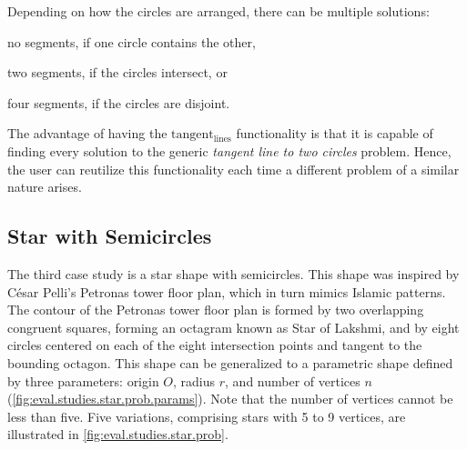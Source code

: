 Depending on how the circles are arranged, there can be multiple solutions:
\begin{enumerate*}[label= (\arabic*)]
  \item no segments, if one circle contains the other,
  \item two segments, if the circles intersect, or
  \item four segments, if the circles are disjoint.
\end{enumerate*}
The advantage of having the $\mathrm{tangent_{lines}}$ functionality is that it
is capable of finding every solution to the generic \textit{tangent line to two
circles} problem.  Hence, the user can reutilize this functionality each time
a different problem of a similar nature arises.

\subsection{Star with Semicircles}%
\label{sec:eval.studies.star}

The third case study is a star shape with semicircles.  This shape was inspired
by César Pelli's Petronas tower floor plan, which in turn mimics Islamic
patterns.  The contour of the Petronas tower floor plan is formed by two
overlapping congruent squares, forming an octagram known as Star of Lakshmi, and
by eight circles centered on each of the eight intersection points and tangent
to the bounding octagon.  This shape can be generalized to a parametric shape
defined by three parameters: origin $O$, radius $r$, and number of vertices $n$
(\cref{fig:eval.studies.star.prob.params}).  Note that the number of vertices
cannot be less than five.  Five variations, comprising stars with 5 to 9
vertices, are illustrated in \cref{fig:eval.studies.star.prob}.

